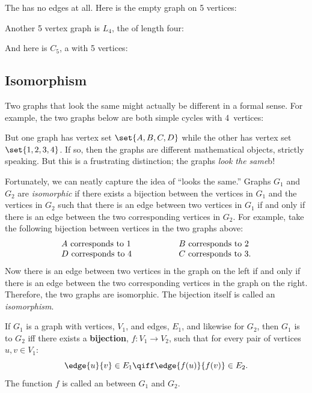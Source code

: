 
The  has no edges at all.  Here is the
empty graph on 5 vertices:


Another 5 vertex graph is $L_4$, the  of length four:


And here is $C_5$, a  with 5 vertices:


\subsection{Isomorphism}
Two graphs that look the same might actually be different in a formal
sense.  For example, the two graphs below are both simple cycles with
4~vertices:

But one graph has vertex set $\set{A, B, C, D}$ while the
other has vertex set $\set{1, 2, 3, 4}$.  If so, then the graphs are
different mathematical objects, strictly speaking.  But this is a
frustrating distinction; the graphs \emph{look the same}b!

Fortunately, we can neatly capture the idea of ``looks the same.''  Graphs
$G_1$ and $G_2$ are \emph{isomorphic} if there exists a bijection between
the vertices in $G_1$ and the vertices in $G_2$ such that there is an edge
between two vertices in $G_1$ if and only if there is an edge between the
two corresponding vertices in $G_2$.  For example, take the following
bijection between vertices in the two graphs above:
\[
\begin{array}{lll}
A \text{ corresponds to } 1 & \hspace{0.5in} & B \text{ corresponds to } 2 \\
D \text{ corresponds to } 4 & & C \text{ corresponds to } 3.
\end{array}
\]
Now there is an edge between two vertices in the graph on the left if and
only if there is an edge between the two corresponding vertices in the
graph on the right.  Therefore, the two graphs are isomorphic.  The
bijection itself is called an \emph{isomorphism}.

\begin{definition}
  If $G_1$ is a graph with vertices, $V_1$, and edges, $E_1$, and likewise
  for $G_2$, then $G_1$ is  to $G_2$ iff there exists a
  \textbf{bijection}, $f: V_1 \to V_2$, such that for every pair of
  vertices $u, v \in V_1$:
\[
\edge{u}{v} \in E_1 \qiff \edge{f(u)}{f(v)} \in E_2.
\]
The function $f$ is called an  between $G_1$ and
$G_2$.
\end{definition}

